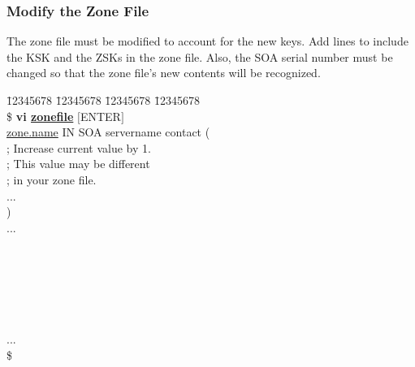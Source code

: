
\subsubsection{Modify the Zone File}

The zone file must be modified to account for the new keys.  Add lines to
include the KSK and the ZSKs in the zone file.  Also, the SOA serial number
must be changed so that the zone file's new contents will be recognized.

\begin{tabbing}
\hspace{0.5in} \= 12345678 \= 12345678 \= 12345678 \= 12345678 \kill \\
\hspace{0.5in}\$ {\bf vi \underline{zonefile}} $[$ENTER$]$ \\
\hspace{0.5in}\underline{zone.name}        IN     SOA        servername contact ( \\
\hspace{3.5in}{\bf 2005092105} ; Increase current value by 1. \\
\hspace{4.4in};  This value may be different \\
\hspace{4.4in}; in your zone file. \\
\hspace{0.5in}\>           \>         ... \\
\hspace{0.5in}\>              ) \\
\hspace{0.5in}... \\
\hspace{0.5in}{\bf ;; ksk} \\
 \\
\hspace{0.5in}{\bf ;; cur zsk} \\
 \\
\hspace{0.5in}{\bf ;; pub zsk} \\
 \\
\hspace{0.5in}... \\
\hspace{0.5in}\$ \\
\end{tabbing}
